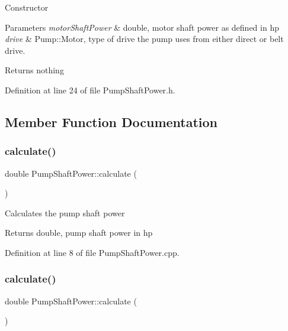 Constructor 
\begin{DoxyParams}{Parameters}
{\em motor\+Shaft\+Power} & double, motor shaft power as defined in hp \\
\hline
{\em drive} & Pump\+::\+Motor, type of drive the pump uses from either direct or belt drive. \\
\hline
\end{DoxyParams}
\begin{DoxyReturn}{Returns}
nothing 
\end{DoxyReturn}


Definition at line 24 of file Pump\+Shaft\+Power.\+h.



\subsection{Member Function Documentation}
\mbox{\label{class_pump_shaft_power_aad32bf26469a5f2984c85ba07c3f84d9}} 
\subsubsection{\texorpdfstring{calculate()}{calculate()}\hspace{0.1cm}{\footnotesize\ttfamily [1/3]}}
{\footnotesize\ttfamily double Pump\+Shaft\+Power\+::calculate (\begin{DoxyParamCaption}{ }\end{DoxyParamCaption})}

Calculates the pump shaft power

\begin{DoxyReturn}{Returns}
double, pump shaft power in hp 
\end{DoxyReturn}


Definition at line 8 of file Pump\+Shaft\+Power.\+cpp.

\mbox{\label{class_pump_shaft_power_aad32bf26469a5f2984c85ba07c3f84d9}} 
\subsubsection{\texorpdfstring{calculate()}{calculate()}\hspace{0.1cm}{\footnotesize\ttfamily [2/3]}}
{\footnotesize\ttfamily double Pump\+Shaft\+Power\+::calculate (\begin{DoxyParamCaption}{ }\end{DoxyParamCaption})}

